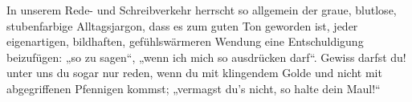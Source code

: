 In unserem Rede- und Schreibverkehr herrscht so allgemein der graue, blutlose, stubenfarbige Alltagsjargon, dass es zum guten Ton geworden ist, jeder eigenartigen, bildhaften, gefühlswärmeren Wendung eine Entschuldigung beizufügen: „so zu sagen“, „wenn ich mich so ausdrücken darf“. Gewiss darfst du! unter uns  du sogar nur reden, wenn du mit klingendem Golde und nicht mit abgegriffenen Pfennigen kommst; „vermagst du’s nicht, so halte dein Maul!“
\par

